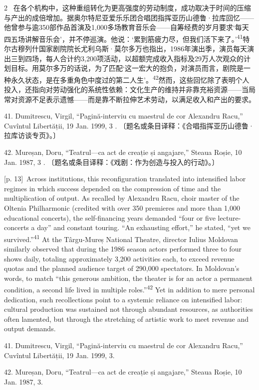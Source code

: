 \documentclass[10pt,a4paper]{article}
\begin{document}
\begin{paracol}{2}
\switchcolumn*
{\scriptsize\color{gray} [p. 13]}\ 在各个机构中，这种重组转化为更高强度的劳动制度，成功取决于时间的压缩与产出的成倍增加。据奥尔特尼亚爱乐乐团合唱团指挥亚历山德鲁·拉库回忆——他曾参与逾350部作品首演及1,000多场教育音乐会——自筹经费的岁月要求‘每天四五场讲解音乐会’，并不停巡演。他说：‘累到筋疲力尽，但我们活下来了。’\nobreak\textsuperscript{41}特尔古穆列什国家剧院院长尤利乌斯·莫尔多万也指出，1986年演出季，演员每天演出三到四场，每人合计约3,200项活动，以超额完成收入指标及29万人次观众的计划目标。用莫尔多万的话说，为了匹配‘这一宏大的抱负，对演员而言，剧院是一种永久状态，是在多重角色中度过的第二人生’。\nobreak\textsuperscript{42}然而，这些回忆除了表明个人投入，还指向对劳动强化的系统性依赖：文化生产的维持并非靠充裕资源——当局常对资源不足表示遗憾——而是靠不断拉伸艺术劳动，以满足收入和产出的要求。\par{\small 41. Dumitrescu, Virgil, “Pagină-interviu cu maestrul de cor Alexandru Racu,” Cuvîntul Libertății, 19 Jan. 1999, 3 . 〔题名或条目译释：《合唱指挥亚历山德鲁·拉库访谈专页》。〕\par}{\small 42. Mureșan, Doru, “Teatrul—ca act de creație și angajare,” Steaua Roșie, 10 Jan. 1987, 3 . 〔题名或条目译释：《戏剧：作为创造与投入的行动》。〕\par}
\switchcolumn
{\scriptsize\color{gray} [p. 13]}\ Across institutions, this reconfiguration translated into intensified labor regimes in which success depended on the compression of time and the multiplication of output. As recalled by Alexandru Racu, choir master of the Oltenia Philharmonic (credited with over 350 premieres and more than 1,000 educational concerts), the self-financing years demanded “four or five lecture-concerts a day” and constant touring. “An exhausting effort,” he stated, “yet we survived.”\nobreak\textsuperscript{41} At the Târgu-Mureș National Theatre, director Iulius Moldovan similarly observed that during the 1986 season actors performed three to four shows daily, totaling approximately 3,200 activities each, to exceed revenue quotas and the planned audience target of 290,000 spectators. In Moldovan’s words, to match “this generous ambition, the theater is for an actor a permanent condition, a second life lived in multiple roles.”\nobreak\textsuperscript{42} Yet in addition to mere personal dedication, such recollections point to a systemic reliance on intensified labor: cultural production was sustained not through abundant resources, as authorities often lamented, but through the stretching of artistic work to meet revenue and output demands.\par{\small 41. Dumitrescu, Virgil, “Pagină-interviu cu maestrul de cor Alexandru Racu,” Cuvîntul Libertății, 19 Jan. 1999, 3.\par}{\small 42. Mureșan, Doru, “Teatrul—ca act de creație și angajare,” Steaua Roșie, 10 Jan. 1987, 3.\par}

\end{paracol}
\end{document}
